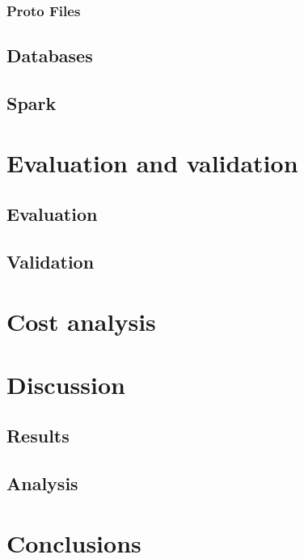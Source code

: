 \documentclass{article}
\newcommand*\fpar{\hspace{1ex}}
\begin{document}
      \subsubsection{Proto Files}
      \fpar %

    \subsection{Databases}

    \subsection{Spark}


\section{Evaluation and validation}
\label{sec:evaluation_and_validation}

    \subsection{Evaluation}
    \label{sec:evaluation}

    \subsection{Validation}
    \label{sec:validation}

\section{Cost analysis}
\label{sec:cost}

\section{Discussion}
\label{sec:discussion}
    \subsection{Results}
    \label{sec:results}

    \subsection{Analysis}
    \label{sec:analysis}

\section{Conclusions}
\label{sec:conclusion}
\end{document}
